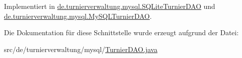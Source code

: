 Implementiert in \hyperlink{classde_1_1turnierverwaltung_1_1mysql_1_1_s_q_lite_turnier_d_a_o_a32997c82c2395a9b38716be40c1a0e35}{de.\+turnierverwaltung.\+mysql.\+S\+Q\+Lite\+Turnier\+D\+AO} und \hyperlink{classde_1_1turnierverwaltung_1_1mysql_1_1_my_s_q_l_turnier_d_a_o_a12c3b6e3dbb7a7b5a01b9ffb70d0c281}{de.\+turnierverwaltung.\+mysql.\+My\+S\+Q\+L\+Turnier\+D\+AO}.



Die Dokumentation für diese Schnittstelle wurde erzeugt aufgrund der Datei\+:\begin{DoxyCompactItemize}
\item 
src/de/turnierverwaltung/mysql/\hyperlink{_turnier_d_a_o_8java}{Turnier\+D\+A\+O.\+java}\end{DoxyCompactItemize}
